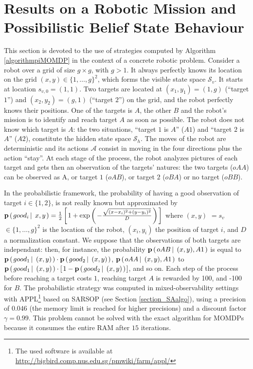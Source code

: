 \section{Results on a Robotic Mission and Possibilistic Belief State Behaviour}
\label{EXPE_CHAP1}
This section is devoted to the use of strategies computed 
by Algorithm \ref{algorithmpiMOMDP} 
in the context of a concrete robotic problem. 
Consider a robot over a grid of size $g \times g$, with $g>1$. 
It always perfectly knows its location on the grid $(x,y) \in \{ 1, \ldots, g \}^2$, 
which forms the visible state space $\mathcal{S}_v$. 
It starts at location $s_{v,0}=(1,1)$.
Two targets are located at $(x_1,y_1)=(1,g)$ (``target $1$'') 
and $(x_2,y_2)=(g,1)$ (``target $2$'') on the grid, 
and the robot perfectly knows their positions. 
One of the targets is $A$, the other $B$ 
and the robot's mission is to identify and reach target $A$ 
as soon as possible. 
The robot does not know which target is $A$: 
the two situations, ``target $1$ is $A$'' ($A1$) 
and ``target $2$ is $A$'' ($A2$), 
constitute the hidden state space $\mathcal{S}_h$. 
The moves of the robot are deterministic 
and its actions $\mathcal{A}$ 
consist in moving in the four directions plus the action ``stay''.
At each stage of the process, 
the robot analyzes pictures of each target 
and gets then an observation of the targets' natures: 
the two targets ($oAA$) can be observed as A, 
or target $1$ ($oAB$), or target $2$ ($oBA$) or no target ($oBB$).

In the probabilistic framework, 
the probability of having a good observation of target $i \in \{ 1,2 \}$, 
is not really known but approximated by 
$\textbf{p} \left( \left.  good_i \, \right| \left. \, x,y  \right. \right) 
= \frac{1}{2} \left[ \left.  1 + \exp \left( \left.  -\frac{\sqrt{(x-x_i)^2+(y-y_i)^2}}{D}  \right. \right)  \right. \right]$ 
where $(x,y)$ $=s_v$ $\in \{ 1,\ldots,g \}^2 $
is the location of the robot, 
$(x_i,y_i)$ the position of target $i$, 
and $D$ a normalization constant. 
We suppose that the observations 
of both targets are independant:
then, for instance, the probability 
$\textbf{p} \left( \left.  oAB \, \right| \left. \, (x,y), A1  \right. \right)$ is equal to 
$\textbf{p} \left( \left.  good_1 \, \right| \left. \, (x,y) \right. \right) 
\cdot \textbf{p} \left( \left.  good_2 \, \right| \left. \, (x,y)  \right. \right)$, 
$\textbf{p} \left( \left.  oAA \, \right| \left. \, (x,y), A1  \right. \right)$ 
to $\textbf{p}\left( \left.  good_1 \, \right| \left. \, (x,y) \right. \right) 
\cdot \left[ \left.  1 - \textbf{p} \left( \left.  good_2 \, \right| \left. \, (x,y)  \right. \right)  \right. \right] $, 
and so on. 
Each step of the process before reaching a target costs $1$, 
reaching target $A$ is rewarded by 100, 
and -100 for $B$. 
The probabilistic strategy was computed 
in mixed-observability settings with APPL\footnote{The used software is available at \url{http://bigbird.comp.nus.edu.sg/pmwiki/farm/appl/}} 
based on SARSOP \cite{OngShaoHsuWee-IJRR10,Kurniawati-RSS08}
(see Section \ref{section_SAalgo}), 
using a precision of $0.046$ 
(the memory limit is reached for higher precisions) 
and a discount factor $\gamma=0.99$. 
This problem cannot be solved 
with the exact algorithm for MOMDPs \cite{AraThoBufCha-ICTAI10} 
because it consumes the entire RAM after $15$ iterations.

